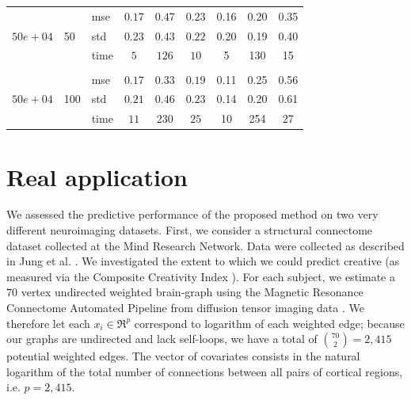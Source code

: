 \documentclass{article} %
\begin{document}
\begin{table}[t]
\begin{center}
\begin{small}
\begin{sc}
\begin{tabular}{lllcccccc}
\multirow{3}{*}{$50e+04$}&\multirow{3}{*}{50}&mse &$0.17$&$0.47$&$0.23$&0.16 &0.20&0.35\\
&&std & $0.23$ & $0.43$&$0.22$&0.20&0.19&0.40\\
&&time &$5$ &$126$&$10$ & 5 & 130 &15 \\

\\
\multirow{3}{*}{$50e+04$}&\multirow{3}{*}{100}&mse &$0.17$&$0.33$&$0.19$&0.11&0.25&0.56\\
&&std & $0.21$ &$0.46$ &$0.23$&0.14&0.20 &0.61\\
&&time &$11$ &$230$&$25$&10&254 &27\\



\hline
\end{tabular}
\end{sc}
\end{small}
\end{center}
\vskip -0.1in
\end{table}


\section{Real application}

We assessed the predictive performance of the proposed method on two very different neuroimaging datasets. First, we consider a structural connectome dataset collected at the Mind Research Network.  Data were collected as described in Jung et al. \cite{Jung2010}.
We investigated the extent to which we could predict creative (as measured via the Composite Creativity Index \cite{Arden2010}).   For each subject, we estimate a $70$ vertex undirected weighted brain-graph using the Magnetic Resonance Connectome Automated Pipeline \cite{MRCAP11} from diffusion tensor imaging data \cite{Mori2006}. We therefore let each $x_i \in \Re^p$ correspond to logarithm of each weighted edge; because our graphs are undirected and lack self-loops, we have a total of $\binom{70}{2}=2,415$ potential weighted edges.
The vector of covariates consists in the natural logarithm of the total number of connections between all pairs of cortical regions, i.e. $p=2,415$. 
\end{document}
